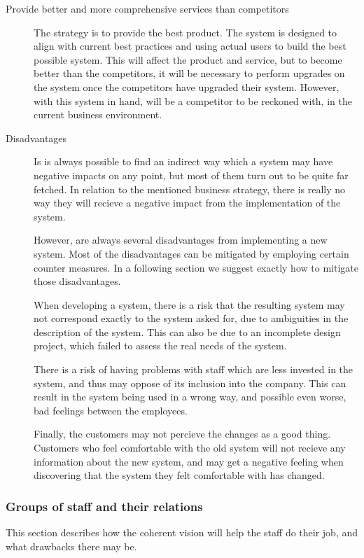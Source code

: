 \begin{description}
\item[Provide better and more comprehensive services than competitors]
The strategy is to provide the best product. The system is designed to align
with current best practices and using actual users to build the best possible
system. This will affect the product and service, but to become better than
the competitors, it will be necessary to perform upgrades on the system once
the competitors have upgraded their system. However, with this system in hand,
\gomonkey{} will be a competitor to be reckoned with, in the current business 
environment.

\item[Disadvantages]
Is is always possible to find an indirect way which a system may have negative
impacts on any point, but most of them turn out to be quite far fetched. In
relation to the mentioned business strategy, there is really no way they will
recieve a negative impact from the implementation of the system.

However, are always several disadvantages from implementing a new system. Most 
of the disadvantages can be mitigated by employing certain counter measures.
In a following section we suggest exactly how to mitigate those disadvantages.
 
When developing a system, there is a risk that the resulting system may not 
correspond exactly to the system asked for, due to ambiguities in the 
description of the system. This can also be due to an incomplete design project,
which failed to assess the real needs of the system.

There is a risk of having problems with staff which are less invested in the
system, and thus may oppose of its inclusion into the company. This can result
in the system being used in a wrong way, and possible even worse, bad feelings 
between the employees. 

Finally, the customers may not percieve the changes as a good thing. Customers
who feel comfortable with the old system will not recieve any information about
the new system, and may get a negative feeling when discovering that the system
they felt comfortable with has changed.
\end{description}

\subsubsection{Groups of staff and their relations}
This section describes how the coherent vision will help the staff do their 
job, and what drawbacks there may be. 


